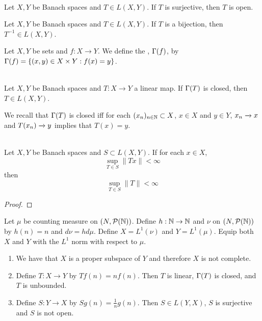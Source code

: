 \documentclass{book}
\begin{document}
	
	\begin{thm}  \\
		Let $X, Y$ be Banach spaces and $T\in L(X,Y)$. If $T$ is surjective, then $T$ is open.
	\end{thm}
	
	\begin{cor}
		Let $X, Y$ be Banach spaces and $T \in L(X,Y)$. If $T$ is a bijection, then $T^{-1} \in L(X,Y)$.
	\end{cor}
	
	\begin{defn} \ld{}
		Let $X,Y$ be sets and $f:X \rightarrow Y$. We define the , $\Gamma(f)$, by $\Gamma(f) = \{(x,y) \in X \times Y: f(x) = y\}$.
	\end{defn}
	
	\begin{thm}  \\		
		Let $X, Y$ be Banach spaces and $T:X \rightarrow Y$ a linear map. If $\Gamma(T)$ is closed, then $T \in L(X,Y)$.  
	\end{thm}
	
	\begin{note}
		We recall that $\Gamma(T)$ is closed iff for each $(x_n)_{n \in \mathbb{N}} \subset X$, $x \in X$ and $y \in Y$, $x_n \xrightarrow{} x$ and $T(x_n) \xrightarrow{} y$ implies that $T(x) = y$. 
	\end{note}
	
	\begin{ex}  \\		
		Let $X, Y$ be Banach spaces and $S \subset L(X,Y)$. If for each $x \in X$, $$\sup_{T \in S} \|Tx \|< \infty$$ then $$\sup_{T \in S} \|T \|< \infty$$
	\end{ex}

	\begin{proof}
	\end{proof}
	
	\begin{ex} \lex{}
		Let $\mu$ be counting measure on $(N, \mathcal{P}(\mathbb{N}))$. Define $h: \mathbb{N} \rightarrow \mathbb{N}$ and $ \nu$ on $(N, \mathcal{P}(\mathbb{N}))$ by $h(n) = n$ and $d \nu = h d \mu$. Define $X=L^1(\nu)$ and $Y = L^1(\mu)$. Equip both $X$ and $Y$ with the $L^1$ norm with respect to $\mu$. 
		\begin{enumerate}
			\item We have that $X$ is a proper subspace of $Y$ and therefore $X$ is not complete.
			\item Define $T: X \rightarrow Y$ by $Tf(n) = nf(n)$. Then $T$ is linear, $\Gamma(T)$ is closed, and $T$ is unbounded.
			\item Define $S:Y \rightarrow X$ by $Sg(n) = \frac{1}{n}g(n)$. Then $S \in L(Y,X)$, $S$ is surjective and $S$ is not open. 
		\end{enumerate}
	\end{ex}
	
\end{document}
